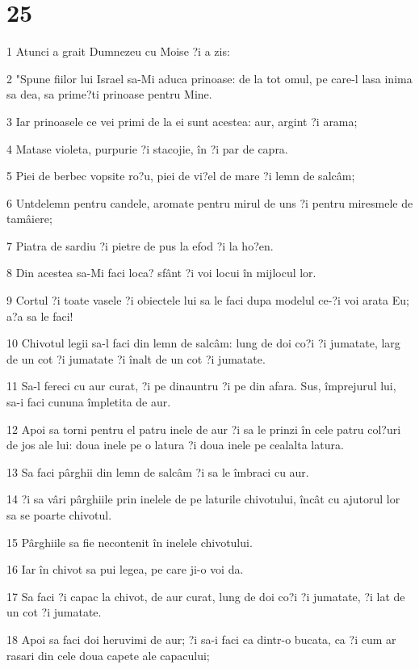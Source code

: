 \chapter{25}

\par 1 Atunci a grait Dumnezeu cu Moise ?i a zis:
\par 2 "Spune fiilor lui Israel sa-Mi aduca prinoase: de la tot omul, pe care-l lasa inima sa dea, sa prime?ti prinoase pentru Mine.
\par 3 Iar prinoasele ce vei primi de la ei sunt acestea: aur, argint ?i arama;
\par 4 Matase violeta, purpurie ?i stacojie, în ?i par de capra.
\par 5 Piei de berbec vopsite ro?u, piei de vi?el de mare ?i lemn de salcâm;
\par 6 Untdelemn pentru candele, aromate pentru mirul de uns ?i pentru miresmele de tamâiere;
\par 7 Piatra de sardiu ?i pietre de pus la efod ?i la ho?en.
\par 8 Din acestea sa-Mi faci loca? sfânt ?i voi locui în mijlocul lor.
\par 9 Cortul ?i toate vasele ?i obiectele lui sa le faci dupa modelul ce-?i voi arata Eu; a?a sa le faci!
\par 10 Chivotul legii sa-l faci din lemn de salcâm: lung de doi co?i ?i jumatate, larg de un cot ?i jumatate ?i înalt de un cot ?i jumatate.
\par 11 Sa-l fereci cu aur curat, ?i pe dinauntru ?i pe din afara. Sus, împrejurul lui, sa-i faci cununa împletita de aur.
\par 12 Apoi sa torni pentru el patru inele de aur ?i sa le prinzi în cele patru col?uri de jos ale lui: doua inele pe o latura ?i doua inele pe cealalta latura.
\par 13 Sa faci pârghii din lemn de salcâm ?i sa le îmbraci cu aur.
\par 14 ?i sa vâri pârghiile prin inelele de pe laturile chivotului, încât cu ajutorul lor sa se poarte chivotul.
\par 15 Pârghiile sa fie necontenit în inelele chivotului.
\par 16 Iar în chivot sa pui legea, pe care ji-o voi da.
\par 17 Sa faci ?i capac la chivot, de aur curat, lung de doi co?i ?i jumatate, ?i lat de un cot ?i jumatate.
\par 18 Apoi sa faci doi heruvimi de aur; ?i sa-i faci ca dintr-o bucata, ca ?i cum ar rasari din cele doua capete ale capacului;
